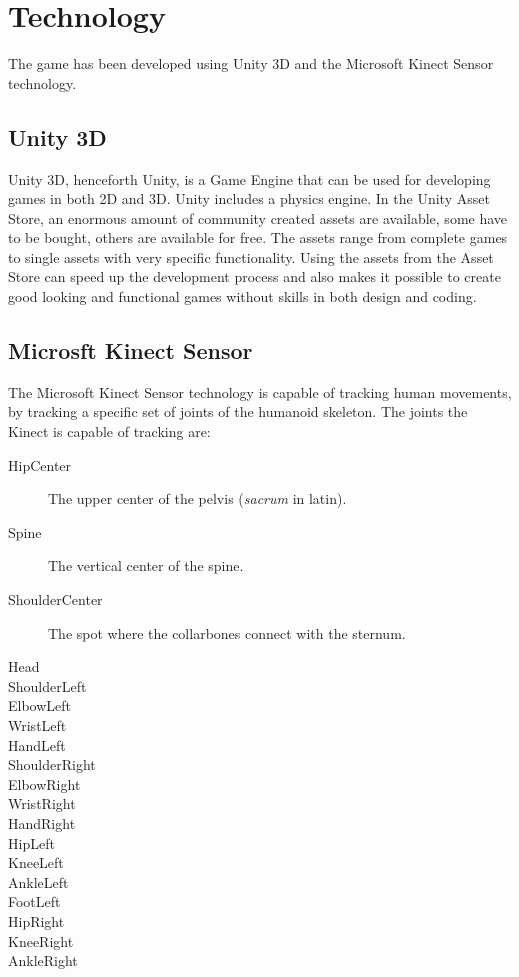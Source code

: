 \documentclass[11pt]{report}
\begin{document}
\section{Technology}
The game has been developed using Unity 3D and the Microsoft Kinect Sensor technology.

\subsection{Unity 3D}
Unity 3D, henceforth Unity, is a Game Engine that can be used for developing games in both 2D and 3D. Unity includes a physics engine. In the Unity Asset Store, an enormous amount of community created assets are available, some have to be bought, others are available for free. The assets range from complete games to single assets with very specific functionality. Using the assets from the Asset Store can speed up the development process and also makes it possible to create good looking and functional games without skills in both design and coding.

\subsection{Microsft Kinect Sensor}
The Microsoft Kinect Sensor technology is capable of tracking human movements, by tracking a specific set of joints of the humanoid skeleton. The joints the Kinect is capable of tracking are:
\begin{description}
	\item[HipCenter] The upper center of the pelvis (\emph{sacrum} in latin).
        	\item[Spine] The vertical center of the spine.
        	\item[ShoulderCenter] The spot where the collarbones connect with the sternum.
        	\item[Head]
        	\item[ShoulderLeft]
        	\item[ElbowLeft]
        	\item[WristLeft]
        	\item[HandLeft]
        	\item[ShoulderRight]
        	\item[ElbowRight]
        	\item[WristRight]
        	\item[HandRight]
        	\item[HipLeft]
        	\item[KneeLeft]
        	\item[AnkleLeft]
        	\item[FootLeft]
        	\item[HipRight]
        	\item[KneeRight]
        	\item[AnkleRight
        	\item[FootRight]
\end{description}
\end{document}
